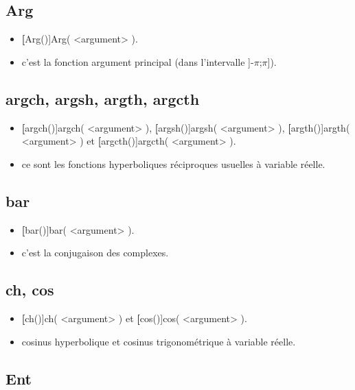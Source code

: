 \subsection{Arg}

\begin{itemize}
 \item \util \textbf[Arg()]{Arg( <argument> )}.
 \item \desc c'est la fonction argument principal (dans l'intervalle ]-$\pi$;$\pi$]).
\end{itemize}

\subsection{argch, argsh, argth, argcth}

\begin{itemize}
 \item \util \textbf[argch()]{argch( <argument> )}, \textbf[argsh()]{argsh( <argument> )}, \textbf[argth()]{argth(
<argument> )} et \textbf[argcth()]{argcth( <argument> )}.
 \item \desc ce sont les fonctions hyperboliques réciproques usuelles à variable réelle.
\end{itemize}

\subsection{bar}

\begin{itemize}
 \item \util \textbf[bar()]{bar( <argument> )}. 
 \item \desc c'est la conjugaison des complexes.
\end{itemize}

\subsection{ch, cos}

\begin{itemize}
 \item \util \textbf[ch()]{ch( <argument> )} et \textbf[cos()]{cos( <argument> )}.
 \item \desc cosinus hyperbolique et cosinus trigonométrique à variable réelle.
\end{itemize}

\subsection{Ent}

